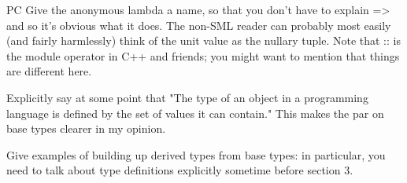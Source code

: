 \documentclass[workingdraft]{usetex-v1}
\begin{document}
\begin{ednote}{PC}
     Give the anonymous lambda a name, so that you don't have to explain
   => and so it's obvious what it does.  The non-SML reader can probably
   most easily (and fairly harmlessly) think of the unit value as the
   nullary tuple.  Note that :: is the module operator in C++ and
   friends; you might want to mention that things are different here.

   Explicitly say at some point that "The type of an object in
   a programming language is defined by the set of values it
   can contain."  This makes the par on base types clearer in
   my opinion.

   Give examples of building up derived types from base types:
   in particular, you need to talk about type definitions
   explicitly sometime before section 3.

\end{ednote}



\end{document}
